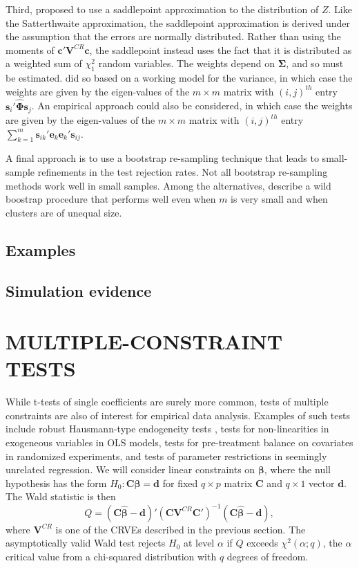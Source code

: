 \documentclass[12pt]{article}\usepackage[]{graphicx}\usepackage[]{color}
\newcommand{\bm}{\mathbf}
\newcommand{\bs}{\boldsymbol}
\begin{document}
Third, \citet{McCaffrey2006improved} proposed to use a saddlepoint approximation to the distribution of $Z$. 
Like the Satterthwaite approximation, the saddlepoint approximation is derived under the assumption that the errors are normally distributed. 
Rather than using the moments of $\bm{c}'\bm{V}^{CR}\bm{c}$, the saddlepoint instead uses the fact that it is distributed as a weighted sum of $\chi^2_1$ random variables. 
The weights depend on $\bs\Sigma$, and so must be estimated. \citet{McCaffrey2006improved} did so based on a working model for the variance, in which case the weights are given by the eigen-values of the $m \times m$ matrix with $(i,j)^{th}$ entry $\bm{s}_i'\hat{\bs\Phi} \bm{s}_j$. 
An empirical approach could also be considered, in which case the weights are given by the eigen-values of the $m \times m$ matrix with $(i,j)^{th}$ entry $\sum_{k=1}^m \bm{s}_{ik}'\bm{e}_k \bm{e}_k' \bm{s}_{ij}$.

A final approach is to use a bootstrap re-sampling technique that leads to small-sample refinements in the test rejection rates. 
Not all bootstrap re-sampling methods work well in small samples. 
Among the alternatives, \citet{Webb2013wild} describe a wild boostrap procedure that performs well even when $m$ is very small and when clusters are of unequal size.  

\subsection{Examples}
\label{subsec:examples_t}

\subsection{Simulation evidence}
\label{subsec:simulation_t}

\section{MULTIPLE-CONSTRAINT TESTS}

While t-tests of single coefficients are surely more common, tests of multiple constraints are also of interest for empirical data analysis. 
Examples of such tests include robust Hausmann-type endogeneity tests \citep{Arellano1993on}, tests for non-linearities in exogeneous variables in OLS models, tests for pre-treatment balance on covariates in randomized experiments, and tests of parameter restrictions in seemingly unrelated regression.
We will consider linear constraints on $\bs\beta$, where the null hypothesis has the form $H_0: \bm{C}\bs\beta = \bm{d}$ for fixed $q \times p$ matrix $\bm{C}$ and $q \times 1$ vector $\bm{d}$. 
The Wald statistic is then \[
Q = \left(\bm{C}\bs{\hat\beta} - \bm{d}\right)'\left(\bm{C} \bm{V}^{CR} \bm{C}'\right)^{-1}\left(\bm{C}\bs{\hat\beta} - \bm{d}\right),
\]
where $\bm{V}^{CR}$ is one of the CRVEs described in the previous section. The asymptotically valid Wald test rejects $H_0$ at level $\alpha$ if $Q$ exceeds $\chi^2(\alpha; q)$, the $\alpha$ critical value from a chi-squared distribution with $q$ degrees of freedom.
\end{document}
